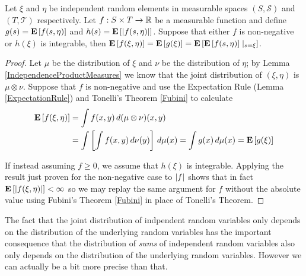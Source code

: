 \begin{lem}\label{DisintegrationIndependentLaws}Let $\xi$ and $\eta$ be
  independent random elements in measurable spaces $(S, \mathcal{S})$
  and $(T, \mathcal{T})$ respectively.  Let $f : S \times T \to
  \mathbb{R}$ be a measurable function and define 
  $g(s) = \textbf{E}\left[f(s, \eta)\right]$ and 
  $h(s) = \textbf{E}\left[\left \vert f(s, \eta) \right \vert\right]$. Suppose that either $f$ is
  non-negative or $h(\xi)$ is integrable, then
$\textbf{E}\left[f(\xi, \eta)\right] = \textbf{E}\left[g(\xi)\right] =
\textbf{E}\left[\textbf{E}\left[f(s, \eta)\right]\mid_{s=\xi}\right] $.
\end{lem}
\begin{proof}
Let $\mu$ be the distribution of $\xi$ and $\nu$ be the distribution
of $\eta$; by Lemma \ref{IndependenceProductMeasures} we know that the
joint distribution of $(\xi, \eta)$ is $\mu \otimes \nu$.  Suppose
that $f$ is non-negative and use the Expectation Rule (Lemma \ref{ExpectationRule}) and
Tonelli's Theorem \ref{Fubini} to calculate
\begin{align*}
\textbf{E}\left[f(\xi, \eta)\right] &= \int f(x,y) \, d(\mu \otimes \nu)(x,y)
\\
&=
\int \left [ \int f(x, y) \, d\nu(y) \right ] \, d\mu(x) = \int g(x)
\, d\mu(x) = \textbf{E}\left[g(\xi)\right]
\end{align*}

If instead assuming $f \geq 0$, we assume that $h(\xi)$ is integrable.
Applying the result just proven for the non-negative case to $\left \vert f \right \vert$
shows that in fact $\textbf{E}\left[ \left \vert f(\xi, \eta) \right \vert\right] < \infty$ so we
may replay the same argument for $f$ without the absolute value using Fubini's Theorem
\ref{Fubini} in place of Tonelli's Theorem.
\end{proof}

The fact that the joint distribution of indpendent random variables
only depends on the distribution of the underlying random variables
has the important consequence that the distribution of \emph{sums} of
independent random variables also only depends on the distribution of
the underlying random variables.  However we can actually be a bit
more precise than that.

